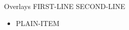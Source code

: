 \documentclass[handout]{beamer}
\begin{document}
\begin{frame}{Overlays}
	FIRST-LINE
	\pause
	SECOND-LINE
	\begin{itemize}
		\item PLAIN-ITEM
	\end{itemize}
\end{frame}
\end{document}
